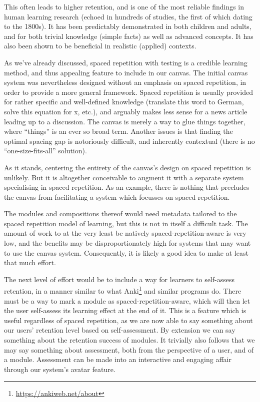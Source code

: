 \documentclass{article}
\begin{document}
\begin{multicols}{2}
This often leads to higher retention, and is one of the most reliable findings 
in human learning research (echoed in hundreds of studies, the first of which 
dating to the 1800s). It has been predictably demonstrated in both children 
and adults, and for both trivial knowledge (simple facts) as well as advanced 
concepts\cite{carpenter2012using}. It has also been shown to be beneficial in 
realistic (applied) contexts\cite{sobel2011spacing, carpenter2012using}.

As we've already discussed\cite{berntsen2015enabling}, spaced repetition with 
testing is a credible learning method, and thus appealing feature to include 
in our canvas. The initial canvas system was nevertheless designed without an 
emphasis on spaced repetition, in order to provide a more general framework. 
Spaced repetition is usually provided for rather specific and well-defined 
knowledge (translate this word to German, solve this equation for x, etc.), 
and arguably makes less sense for a news article leading up to a discussion. 
The canvas is merely a way to glue things together, where ``things'' is an 
ever so broad term. Another issues is that finding the optimal spacing gap is 
notoriously difficult, and inherently contextual (there is no 
``one-size-fits-all'' solution)\cite{carpenter2012using}.

As it stands, centering the entirety of the canvas's design on spaced 
repetition is unlikely. But it is altogether conceivable to augment it with a 
separate system specialising in spaced repetition. As an example, there is 
nothing that precludes the canvas from facilitating a system which focusses on 
spaced repetition.

The modules and compositions thereof would need metadata tailored to the 
spaced repetition model of learning, but this is not in itself a difficult 
task. The amount of work to at the very least be natively 
spaced-repetition-aware is very low, and the benefits may be 
disproportionately high for systems that may want to use the canvas system. 
Consequently, it is likely a good idea to make at least that much effort.

The next level of effort would be to include a way for learners to self-assess 
retention, in a manner similar to what
Anki\footnote{\url{https://ankiweb.net/about}} and similar programs do. There 
must be a way to mark a module as spaced-repetition-aware, which will then let 
the user self-assess its learning effect at the end of it. This is a feature 
which is useful regardless of spaced repetition, as we are now able to say 
something about our users' retention level based on self-assessment. By 
extension we can say something about the retention success of modules. It 
trivially also follows that we may say something about assessment, both from 
the perspective of a user, and of a module. Assessment can be made into an 
interactive and engaging affair through our system's avatar 
feature\cite{berntsen2015enabling}.


\end{multicols}
\end{document}
